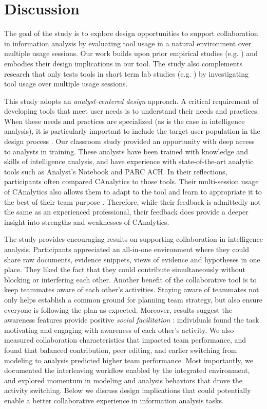 \section{Discussion}\label{discussion}

The goal of the study is to explore design opportunities to support
collaboration in information analysis by evaluating tool usage in a natural
environment over multiple usage sessions. Our work builds upon prior
empirical studies (e.g.
\cite{Carroll2013,Borge2012,Kang2011,Chin2009}) and embodies
their design implications in our tool. The study also complements
research that only tests tools in short term lab studies (e.g.
\cite{Convertino2011,Goyal2016,Hajizadeh2013}) by investigating tool usage over multiple usage sessions.

This study adopts an \emph{analyst-centered design} approach. A critical requirement of developing tools that meet user needs is to
understand their needs and practices. When these needs and practices
are specialized (as is the case in intelligence analysis), it is
particularly important to include the target user population in
the design process \cite{Scholtz2014}.
Our classroom study provided an opportunity with deep
access to analysts in training. These analysts have been trained
with knowledge and skills of intelligence analysis, and have experience with state-of-the-art analytic
tools such as Analyst's Notebook and PARC ACH. In their reflections, participants often compared CAnalytics to
those tools. Their multi-session usage of CAnalytics also allows them to adapt to the tool and learn to appropriate it to the best of their team purpose \cite{Stahl2006}. Therefore, while their feedback is
admittedly not the same as an experienced professional,
their feedback does provide a deeper insight into strengths and
weaknesses of CAnalytics.

The study provides encouraging results on supporting collaboration in
intelligence analysis. Participants appreciated an all-in-one environment where
they could share raw documents, evidence snippets, views of evidence and
hypotheses in one place. They liked the fact that they could contribute
simultaneously without blocking or interfering each other. Another benefit of
the collaborative tool is to keep teammates aware of each other's activities.
Staying aware of teammates not only helps establish a common ground for planning
team strategy, but also ensure everyone is following the plan as expected.
Moreover, results suggest the awareness features provide positive \emph{social
facilitation} \cite{Zajonc1965}: individuals found the task motivating and
engaging with awareness of each other's activity. We also measured collaboration
characteristics that impacted team performance, and found that balanced
contribution, peer editing, and earlier switching from modeling to analysis
predicted higher team performance. Most importantly, we documented the interleaving workflow enabled by the integrated environment, and explored momentum in modeling and analysis behaviors that drove the activity switching. Below we discuss design implications that could potentially enable a better collaborative experience in information analysis tasks.


